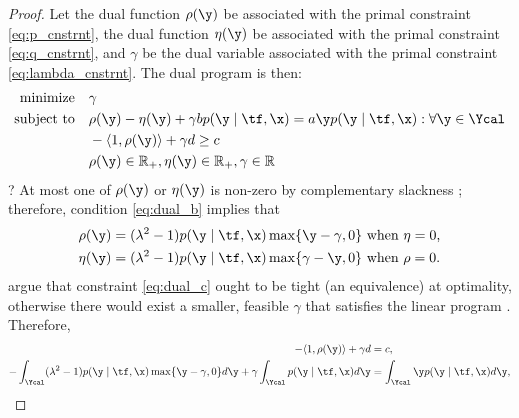 \begin{lemma}
\begin{proof}
        Let the dual function $\rho(\y)$ be associated with the primal constraint \cref{eq:p_cnstrnt}, the dual function $\eta(\y)$ be associated with the primal constraint \cref{eq:q_cnstrnt}, and $\gamma$ be the dual variable associated with the primal constraint \cref{eq:lambda_cnstrnt}. 
        The dual program is then:
        \begin{subequations}
            \begin{align}
                \text{minimize}\quad &\gamma \label{eq:dual_a} \\
                \text{subject to}\quad & \rho(\y) - \eta(\y) + \gamma b p(\y \mid \tf, \x) = a \y p(\y \mid \tf, \x): \forall\y \in \Ycal \label{eq:dual_b} \\
                & -\langle 1, \rho(\y) \rangle + \gamma d \geq c \label{eq:dual_c} \\
                & \rho(\y) \in \mathbb{R}_+, \eta(\y) \in \mathbb{R}_+, \gamma \in \mathbb{R}
            \end{align}
        \end{subequations}
        ? 
        At most one of $\rho(\y)$ or $\eta(\y)$ is non-zero by complementary slackness ; therefore, condition \cref{eq:dual_b} implies that
        \begin{equation*}
            \begin{split}
                \rho(\y) &= (\lambda^2 - 1)p(\y \mid \tf, \x) \max\{\y - \gamma, 0\} \text{ when $\eta=0$,} \\
                \eta(\y) &= (\lambda^2 - 1)p(\y \mid \tf, \x) \max\{\gamma - \y, 0\} \text{ when $\rho=0$.} 
            \end{split}
        \end{equation*}
        \cite{kallus2019interval} argue that constraint \cref{eq:dual_c} ought to be tight (an equivalence) at optimality, otherwise there would exist a smaller, feasible $\gamma$ that satisfies the linear program . 
        Therefore,
        \begin{equation}
            \begin{split}
                -\langle 1, \rho(\y) \rangle + \gamma d &= c, \\
                -\int_{\Ycal} (\lambda^2 - 1)p(\y \mid \tf, \x) \max\{\y - \gamma, 0\}d\y + \gamma \int_{\Ycal} p(\y \mid \tf, \x) d\y &=  \int_{\Ycal} \y p(\y \mid \tf, \x) d\y, \\

\end{split}
\end{equation}
\end{proof}
\end{lemma}
